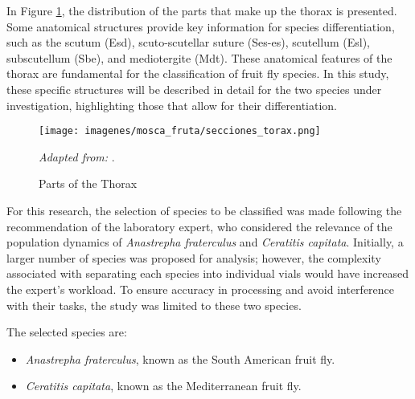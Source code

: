 In Figure \ref{fig:taxonomiatorax}, the distribution of the parts that make up the thorax is presented. Some anatomical structures provide key information for species differentiation, such as the scutum (Esd), scuto-scutellar suture (Ses-es), scutellum (Esl), subscutellum (Sbe), and mediotergite (Mdt). These anatomical features of the thorax are fundamental for the classification of fruit fly species. In this study, these specific structures will be described in detail for the two species under investigation, highlighting those that allow for their differentiation.


\begin{figure}[htbp]
    \centering
    \texttt{[image: imagenes/mosca\_fruta/secciones\_torax.png]}
    \caption{Parts of the Thorax}
    \scriptsize \textit{Adapted from:} \cite{senasaTephritidae, especiesImEco}.
    \label{fig:taxonomiatorax}
\end{figure}

For this research, the selection of species to be classified was made following the recommendation of the laboratory expert, who considered the relevance of the population dynamics of \textit{Anastrepha fraterculus} and \textit{Ceratitis capitata}. Initially, a larger number of species was proposed for analysis; however, the complexity associated with separating each species into individual vials would have increased the expert's workload. To ensure accuracy in processing and avoid interference with their tasks, the study was limited to these two species.

The selected species are:
\begin{itemize}
	\item \textit{Anastrepha fraterculus}, known as the South American fruit fly.
	\item \textit{Ceratitis capitata}, known as the Mediterranean fruit fly.
\end{itemize}

